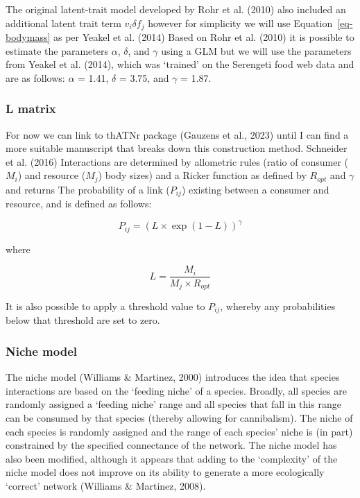 \documentclass[
]{article}
\begin{document}
The original latent-trait model developed by Rohr et al. (2010) also
included an additional latent trait term \(v_{i} \delta f_{j}\) however
for simplicity we will use Equation~\ref{eq-bodymass} as per Yeakel et
al. (2014) Based on Rohr et al. (2010) it is possible to estimate the
parameters \(\alpha\), \(\delta\), and \(\gamma\) using a GLM but we
will use the parameters from Yeakel et al. (2014), which was `trained'
on the Serengeti food web data and are as follows: \(\alpha\) = 1.41,
\(\delta\) = 3.75, and \(\gamma\) = 1.87.

\subsubsection{L matrix}\label{l-matrix}

For now we can link to thATNr package (Gauzens et al., 2023) until I can
find a more suitable manuscript that breaks down this construction
method. Schneider et al. (2016) Interactions are determined by
allometric rules (ratio of consumer (\(M_{i}\)) and resource (\(M_{j}\))
body sizes) and a Ricker function as defined by \(R_{opt}\) and
\(\gamma\) and returns The probability of a link (\(P_{ij}\)) existing
between a consumer and resource, and is defined as follows:

\[
P_{ij} = (L \times \exp(1 - L))^{\gamma}
\]

where

\[
L = \frac{M_{i}}{M_{j} \times R_{opt}}
\]

It is also possible to apply a threshold value to \(P_{ij}\), whereby
any probabilities below that threshold are set to zero.

\subsubsection{Niche model}\label{niche-model}

The niche model (Williams \& Martinez, 2000) introduces the idea that
species interactions are based on the `feeding niche' of a species.
Broadly, all species are randomly assigned a `feeding niche' range and
all species that fall in this range can be consumed by that species
(thereby allowing for cannibalism). The niche of each species is
randomly assigned and the range of each species' niche is (in part)
constrained by the specified connectance of the network. The niche model
has also been modified, although it appears that adding to the
`complexity' of the niche model does not improve on its ability to
generate a more ecologically `correct' network (Williams \& Martinez,
2008).
\end{document}
